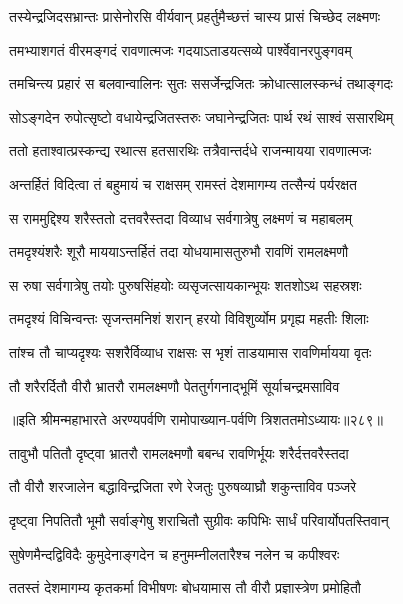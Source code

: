 \twolineshloka
{तस्येन्द्रजिदसभ्रान्तः प्रासेनोरसि वीर्यवान्}
{प्रहर्तुमैच्छत्तं चास्य प्रासं चिच्छेद लक्ष्मणः}


\twolineshloka
{तमभ्याशगतं वीरमङ्गदं रावणात्मजः}
{गदयाऽताडयत्सव्ये पार्श्वेवानरपुङ्गवम्}


\twolineshloka
{तमचिन्त्य प्रहारं स बलवान्वालिनः सुतः}
{ससर्जेन्द्रजितः क्रोधात्सालस्कन्धं तथाङ्गदः}


\twolineshloka
{सोऽङ्गदेन रुपोत्सृष्टो वधायेन्द्रजितस्तरुः}
{जघानेन्द्रजितः पार्थ रथं साश्वं ससारथिम्}


\twolineshloka
{ततो हताश्वात्प्रस्कन्द्य रथात्स हतसारथिः}
{तत्रैवान्तर्दधे राजन्मायया रावणात्मजः}


\twolineshloka
{अन्तर्हितं विदित्वा तं बहुमायं च राक्षसम्}
{रामस्तं देशमागम्य तत्सैन्यं पर्यरक्षत}


\twolineshloka
{स राममुद्दिश्य शरैस्ततो दत्तवरैस्तदा}
{विव्याध सर्वगात्रेषु लक्ष्मणं च महाबलम्}


\twolineshloka
{तमदृश्यंशरैः शूरौ माययाऽन्तर्हितं तदा}
{योधयामासतुरुभौ रावणिं रामलक्ष्मणौ}


\twolineshloka
{स रुषा सर्वगात्रेषु तयोः पुरुषसिंहयोः}
{व्यसृजत्सायकान्भूयः शतशोऽथ सहस्रशः}


\twolineshloka
{तमदृश्यं विचिन्वन्तः सृजन्तमनिशं शरान्}
{हरयो विविशुर्व्योम प्रगृह्य महतीः शिलाः}


\twolineshloka
{तांश्च तौ चाप्यदृश्यः सशरैर्विव्याध राक्षसः}
{स भृशं ताडयामास रावणिर्मायया वृतः}


\twolineshloka
{तौ शरैरर्दितौ वीरौ भ्रातरौ रामलक्ष्मणौ}
{पेततुर्गगनाद्भूमिं सूर्याचन्द्रमसाविव}


॥इति श्रीमन्महाभारते अरण्यपर्वणि रामोपाख्यान-पर्वणि त्रिशततमोऽध्यायः॥२८९॥




\twolineshloka
{तावुभौ पतितौ दृष्ट्वा भ्रातरौ रामलक्ष्मणौ}
{बबन्ध रावणिर्भूयः शरैर्दत्तवरैस्तदा}


\twolineshloka
{तौ वीरौ शरजालेन बद्धाविन्द्रजिता रणे}
{रेजतुः पुरुषव्याघ्रौ शकुन्ताविव पञ्जरे}


\twolineshloka
{दृष्ट्वा निपतितौ भूमौ सर्वाङ्गेषु शराचितौ}
{सुग्रीवः कपिभिः सार्धं परिवार्योपतस्तिवान्}


\twolineshloka
{सुषेणमैन्दद्विविदैः कुमुदेनाङ्गदेन च}
{हनुमम्नीलतारैश्च नलेन च कपीश्वरः}


\twolineshloka
{ततस्तं देशमागम्य कृतकर्मा विभीषणः}
{बोधयामास तौ वीरौ प्रज्ञास्त्रेण प्रमोहितौ}


